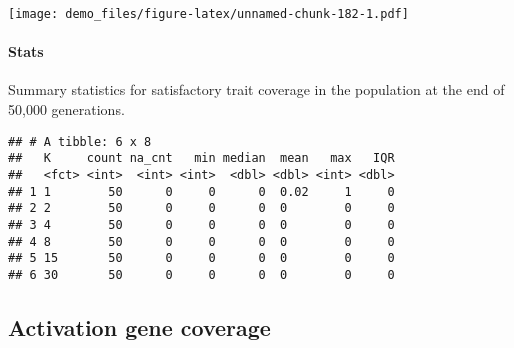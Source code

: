 \documentclass[]{book}
\newenvironment{Shaded}{\begin{snugshade}}{\end{snugshade}}
\newcommand{\DataTypeTok}[1]{\textcolor[rgb]{0.13,0.29,0.53}{#1}}
\newcommand{\KeywordTok}[1]{\textcolor[rgb]{0.13,0.29,0.53}{\textbf{#1}}}
\newcommand{\NormalTok}[1]{#1}
\newcommand{\OperatorTok}[1]{\textcolor[rgb]{0.81,0.36,0.00}{\textbf{#1}}}
\newcommand{\OtherTok}[1]{\textcolor[rgb]{0.56,0.35,0.01}{#1}}
\newcommand{\StringTok}[1]{\textcolor[rgb]{0.31,0.60,0.02}{#1}}
\let\oldparagraph\paragraph
\renewcommand{\paragraph}[1]{\oldparagraph{#1}\mbox{}}
\begin{document}
\texttt{[image: demo\_files/figure-latex/unnamed-chunk-182-1.pdf]}

\hypertarget{stats-80}{%
\paragraph{Stats}\label{stats-80}}

Summary statistics for satisfactory trait coverage in the population at the end of 50,000 generations.

\begin{Shaded}
\end{Shaded}

\begin{verbatim}
## # A tibble: 6 x 8
##   K     count na_cnt   min median  mean   max   IQR
##   <fct> <int>  <int> <int>  <dbl> <dbl> <int> <dbl>
## 1 1        50      0     0      0  0.02     1     0
## 2 2        50      0     0      0  0        0     0
## 3 4        50      0     0      0  0        0     0
## 4 8        50      0     0      0  0        0     0
## 5 15       50      0     0      0  0        0     0
## 6 30       50      0     0      0  0        0     0
\end{verbatim}

\hypertarget{activation-gene-coverage-12}{%
\subsection{Activation gene coverage}\label{activation-gene-coverage-12}}
\end{document}
